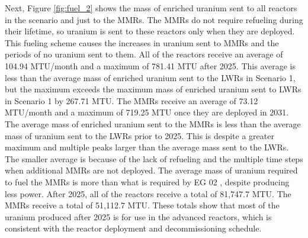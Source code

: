 Next, Figure \ref{fig:fuel_2} shows the mass of enriched uranium sent to all 
reactors in the scenario and just to the \glspl{MMR}. The \glspl{MMR} 
do not require refueling during their lifetime, so uranium is  
sent to these reactors only when they are deployed. This fueling scheme 
causes the increases in uranium sent to \glspl{MMR} and the periods of 
no uranium sent to them. All of the reactors receive an average of 104.94 
MTU/month and a maximum of 781.41 MTU after 2025. 
This average is less than the average mass of enriched uranium 
sent to the \glspl{LWR} in Scenario 1, but the maximum exceeds the maximum 
mass of enriched uranium sent to \glspl{LWR} in Scenario 1 by 267.71 MTU.
The \glspl{MMR} receive an average of 73.12 MTU/month and a maximum of 719.25 
MTU once they are deployed in 2031. The average 
mass of enriched uranium sent to the 
\glspl{MMR} is less than the average mass of uranium sent to the \glspl{LWR}
prior to 2025. This is despite a greater maximum and multiple peaks larger
than the
average mass sent to the \glspl{LWR}. The smaller average is because of the 
lack of refueling and the multiple time steps when additional 
\glspl{MMR} are not deployed. The average mass of uranium required to fuel 
the \glspl{MMR} is more than what is required by \gls{EG} 02 
\cite{wigeland_nuclear_2014}, despite producing less power. 
After 2025, all of the reactors receive a total of 81,747.7 MTU. The  
\glspl{MMR} receive a total of 51,112.7 MTU. These totals show that most 
of the uranium produced after 2025 is for use in the advanced reactors, 
which is consistent with the reactor deployment and decommissioning schedule. 

